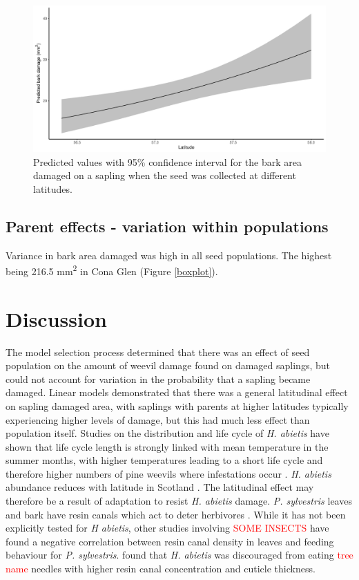 \documentclass[a4paper, 11pt]{article}
\newcommand{\todo}[1]{\textcolor{red}{#1}}   %
\begin{document}
\begin{figure}
	\includegraphics[width=\textwidth]{pred_lat}
	\caption{Predicted values with 95\% confidence interval for the bark area damaged on a sapling when the seed was collected at different latitudes.}
\end{figure}


\subsection*{Parent effects - variation within populations}

Variance in bark area damaged was high in all seed populations. The highest being 216.5 mm\textsuperscript{2} in Cona Glen (Figure \ref{boxplot}).

\section*{Discussion}

The model selection process determined that there was an effect of seed population on the amount of weevil damage found on damaged saplings, but could not account for variation in the probability that a sapling became damaged. Linear models demonstrated that there was a general latitudinal effect on sapling damaged area, with saplings with parents at higher latitudes typically experiencing higher levels of damage, but this had much less effect than population itself. Studies on the distribution and life cycle of \textit{H. abietis} have shown that life cycle length is strongly linked with mean temperature in the summer months, with higher temperatures leading to a short life cycle and therefore higher numbers of pine weevils where infestations occur \citep{Leather1999}. \textit{H. abietis} abundance reduces with latitude in Scotland \citep{Barredo2015}. The latitudinal effect may therefore be a result of adaptation to resist \textit{H. abietis} damage. \textit{P. sylvestris} leaves and bark have resin canals which act to deter herbivores \citep{}. While it has not been explicitly tested for \textit{H abietis}, other studies involving \todo{SOME INSECTS} have found a negative correlation between resin canal density in leaves and feeding behaviour for \textit{P. sylvestris}. \citet{} found that \textit{H. abietis} was discouraged from eating \todo{tree name} needles with higher resin canal concentration and cuticle thickness.
\end{document}
